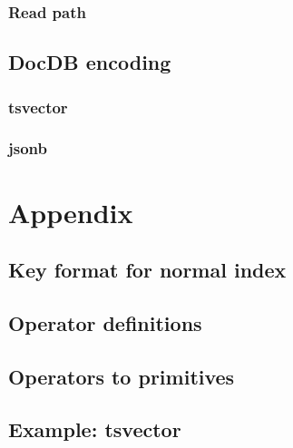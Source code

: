 \documentclass[11pt]{article}
\begin{document}
\hypertarget{read-path}{%
\subsubsection{Read path}\label{read-path}}


\hypertarget{docdb-encoding}{%
\subsection{DocDB encoding}\label{docdb-encoding}}


\hypertarget{tsvector}{%
\subsubsection{tsvector}\label{tsvector}}


\hypertarget{jsonb}{%
\subsubsection{jsonb}\label{jsonb}}


\newpage
\hypertarget{appendix}{%
\section{Appendix}\label{appendix}}

\hypertarget{key-format-for-normal-index}{%
\subsection{Key format for normal index}\label{key-format-for-normal-index}}


\hypertarget{operator-definitions}{%
\subsection{Operator definitions}\label{operator-definitions}}


\hypertarget{operators-to-primitives}{%
\subsection{Operators to primitives}\label{operators-to-primitives}}


\hypertarget{example-tsvector}{%
\subsection{Example: tsvector}\label{example-tsvector}}

\end{document}
